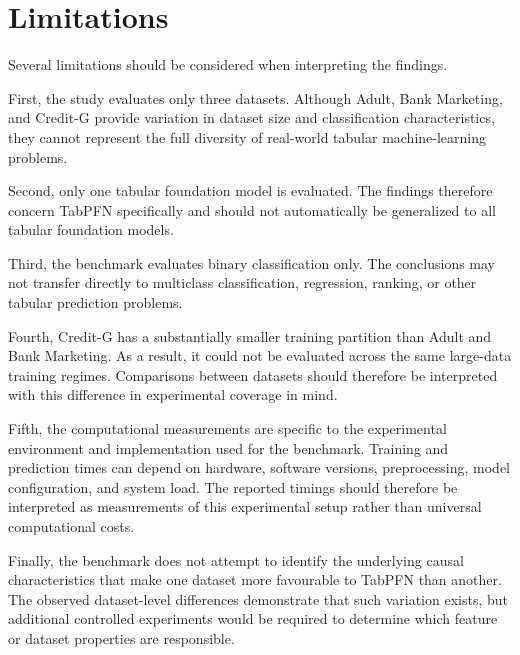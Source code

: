 \section{Limitations}\label{limitations}

Several limitations should be considered when interpreting the findings.

First, the study evaluates only three datasets. Although Adult, Bank Marketing, and Credit-G provide variation in dataset size and classification characteristics, they cannot represent the full diversity of real-world tabular machine-learning problems.

Second, only one tabular foundation model is evaluated. The findings therefore concern TabPFN specifically and should not automatically be generalized to all tabular foundation models.

Third, the benchmark evaluates binary classification only. The conclusions may not transfer directly to multiclass classification, regression, ranking, or other tabular prediction problems.

Fourth, Credit-G has a substantially smaller training partition than Adult and Bank Marketing. As a result, it could not be evaluated across the same large-data training regimes. Comparisons between datasets should therefore be interpreted with this difference in experimental coverage in mind.

Fifth, the computational measurements are specific to the experimental environment and implementation used for the benchmark. Training and prediction times can depend on hardware, software versions, preprocessing, model configuration, and system load. The reported timings should therefore be interpreted as measurements of this experimental setup rather than universal computational costs.

Finally, the benchmark does not attempt to identify the underlying causal characteristics that make one dataset more favourable to TabPFN than another. The observed dataset-level differences demonstrate that such variation exists, but additional controlled experiments would be required to determine which feature or dataset properties are responsible.
